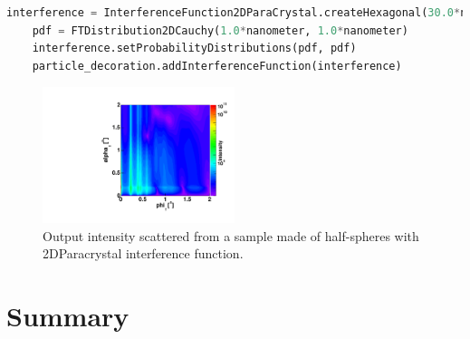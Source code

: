 \begin{lstlisting}[language=python, style=eclipseboxed,numbers=none,nolol,caption={\Code{Python} script to define a "2DParacrystal" interference function between particles forming an hexagonal monolayer. },label={lst:2dlatticeinterf}]
    interference = InterferenceFunction2DParaCrystal.createHexagonal(30.0*nanometer,0.0, 40.0*micrometer, 40.0*micrometer)|
    pdf = FTDistribution2DCauchy(1.0*nanometer, 1.0*nanometer)
    interference.setProbabilityDistributions(pdf, pdf)
    particle_decoration.addInterferenceFunction(interference)
\end{lstlisting}

\begin{figure}[h]
\begin{center}
\includegraphics[width=0.5\textwidth]{Figures/HSphere_2DDL}
\end{center}
\caption{Output intensity scattered from a sample made of half-spheres with 2DParacrystal interference function.}
\label{fig:2ddl}
\end{figure}

\FloatBarrier

\section{Summary}

